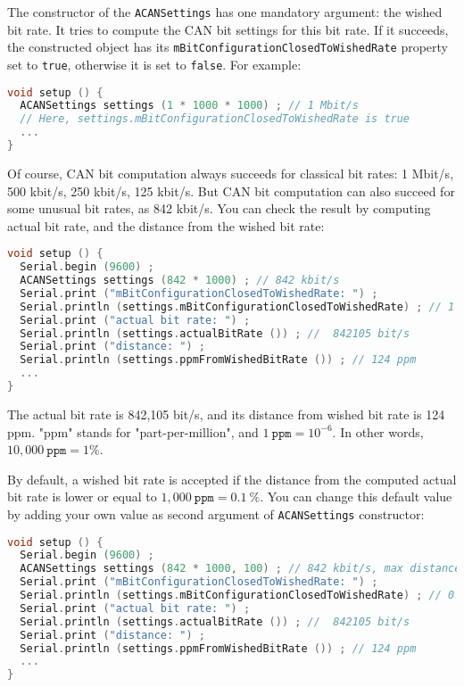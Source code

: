 \documentclass[9pt, a4paper, obeyspaces, openany]{extarticle}
\begin{document}
The constructor of the \texttt{ACANSettings} has one mandatory argument: the wished bit rate. It tries to compute the CAN bit settings for this bit rate. If it succeeds, the constructed object has its \texttt{mBitConfigurationClosedToWishedRate} property set to \texttt{true}, otherwise it is set to \texttt{false}. For example:
{ \small\begin{lstlisting}[language=c++]
void setup () {
  ACANSettings settings (1 * 1000 * 1000) ; // 1 Mbit/s
  // Here, settings.mBitConfigurationClosedToWishedRate is true
  ...
}
\end{lstlisting}}

Of course, CAN bit computation always succeeds for classical bit rates: 1 Mbit/s, 500 kbit/s, 250 kbit/s, 125 kbit/s. But CAN bit computation can also succeed for some unusual bit rates, as 842 kbit/s. You can check the result by computing actual bit rate, and the distance from the wished bit rate:
{ \small\begin{lstlisting}[language=c++]
void setup () {
  Serial.begin (9600) ;
  ACANSettings settings (842 * 1000) ; // 842 kbit/s
  Serial.print ("mBitConfigurationClosedToWishedRate: ") ;
  Serial.println (settings.mBitConfigurationClosedToWishedRate) ; // 1 (--> is true)
  Serial.print ("actual bit rate: ") ;
  Serial.println (settings.actualBitRate ()) ; //  842105 bit/s
  Serial.print ("distance: ") ;
  Serial.println (settings.ppmFromWishedBitRate ()) ; // 124 ppm
  ...
}
\end{lstlisting}}

The actual bit rate is 842,105 bit/s, and its distance from wished bit rate is 124 ppm. "ppm" stands for "part-per-million", and $1~\texttt{ppm} = 10^{-6}$. In other words, $10,000~\texttt{ppm}=1\%$.


By default, a wished bit rate is accepted if the distance from the computed actual bit rate is lower or equal to $1,000~\texttt{ppm} = 0.1~\%$. You can change this default value by adding your own value as second argument of \texttt{ACANSettings} constructor:
{ \small\begin{lstlisting}[language=c++]
void setup () {
  Serial.begin (9600) ;
  ACANSettings settings (842 * 1000, 100) ; // 842 kbit/s, max distance is 100 ppm
  Serial.print ("mBitConfigurationClosedToWishedRate: ") ;
  Serial.println (settings.mBitConfigurationClosedToWishedRate) ; // 0 (--> is false)
  Serial.print ("actual bit rate: ") ;
  Serial.println (settings.actualBitRate ()) ; //  842105 bit/s
  Serial.print ("distance: ") ;
  Serial.println (settings.ppmFromWishedBitRate ()) ; // 124 ppm
  ...
}
\end{lstlisting}}
\end{document}
